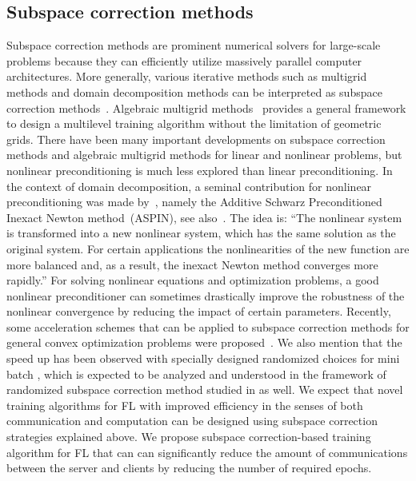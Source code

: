 \begin{itemize}
\subsection{Subspace correction methods}
Subspace correction methods are prominent numerical solvers for large-scale problems because they can efficiently utilize massively parallel computer architectures. More generally, various iterative methods such as multigrid methods and domain decomposition methods can be interpreted as subspace correction methods~\cite{Xu:1992}. Algebraic multigrid methods~\cite{XZ:2017} provides a general framework to design a multilevel training algorithm without the limitation of geometric grids. There have been many important developments on subspace correction methods and algebraic multigrid methods for linear and nonlinear problems, but nonlinear preconditioning is much less explored than linear preconditioning. In the context of domain decomposition, a seminal contribution for nonlinear preconditioning was made by~\cite{CKY:2001}, namely the Additive Schwarz Preconditioned Inexact Newton method~(ASPIN), see also~\cite{CK:2002}. The idea is: “The nonlinear system is transformed into a new nonlinear system, which has the same solution as the original system. For certain applications the nonlinearities of the new function are more balanced and, as a result, the inexact Newton method converges more rapidly.” For solving nonlinear equations and optimization problems, a good nonlinear preconditioner can sometimes drastically improve the robustness of the nonlinear convergence by reducing the impact of certain parameters. 
Recently, some acceleration schemes that can be applied to subspace correction methods for general convex optimization problems were proposed~\cite{Park:2021,Park:2022}. We also mention that the speed up has been observed with specially designed randomized choices for mini batch \cite{li2019convergence,zhou2022convergence}, which is expected to be analyzed and understood in the framework of randomized subspace correction method studied in \cite{hu2019randomized} as well. We expect that novel training algorithms for FL with improved efficiency in the senses of both communication and computation can be designed using subspace correction strategies explained above. We propose subspace correction-based training algorithm for FL that can can significantly reduce the amount of communications between the server and clients by reducing the number of required epochs.


\end{itemize}
